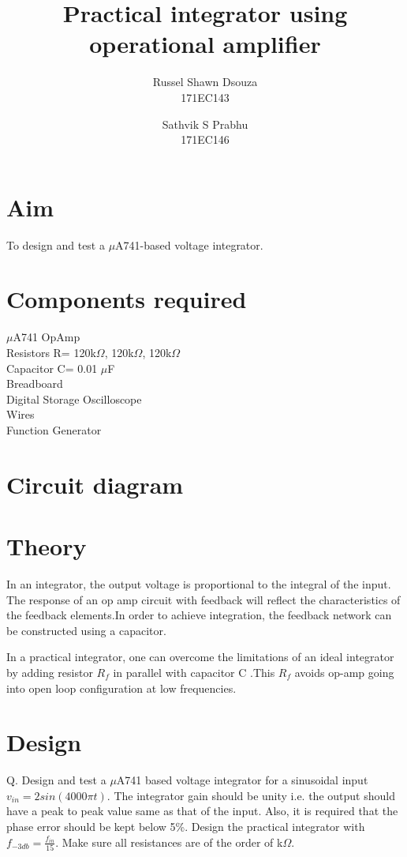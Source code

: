 \documentclass[12pt, titlepage]{article}
\title{\textbf{Practical integrator using operational amplifier}}
\author{
  Russel Shawn Dsouza\\
  171EC143
  \and
  Sathvik S Prabhu\\
  171EC146
}
\date{}
\theoremstyle{definition}
\begin{document}
  \maketitle

  \tableofcontents

  \newpage
  \section{Aim}
  To design and test a $\mu$A741-based voltage integrator.

  \section*{Components required}
  $\mu$A741 OpAmp\\
  Resistors R= 120k$\Omega$, 120k$\Omega$, 120k$\Omega$\\
  Capacitor C= 0.01 $\mu$F\\
  Breadboard\\
  Digital Storage Oscilloscope\\
  Wires\\
  Function Generator\\
  \section*{Circuit diagram}
	

  \newpage
  \section{Theory}
In an integrator, the output voltage is proportional to the integral of the input. The response of an op amp circuit with feedback will reflect the characteristics of the feedback elements.In order to achieve integration, the feedback network can be constructed using a capacitor.
  
  In a practical integrator, one can overcome the limitations of an ideal integrator by adding resistor $R_{f}$ in parallel with capacitor C .This $R_{f}$ avoids op-amp going into open loop configuration at low frequencies.

  \newpage
  \section{Design}
  Q. Design and test a $\mu$A741 based voltage integrator for a sinusoidal input $v_{in}=2sin(4000\pi t)$.
  The integrator gain should be unity i.e. the output should have a peak to peak value same as that of the input. Also, it is required that the phase error should be kept below 5\%.
  Design the practical integrator with $f_{-3db} = \frac{f_{in}}{15}$.
   Make sure all resistances are of the order of k$\Omega$.
  
\end{document}
